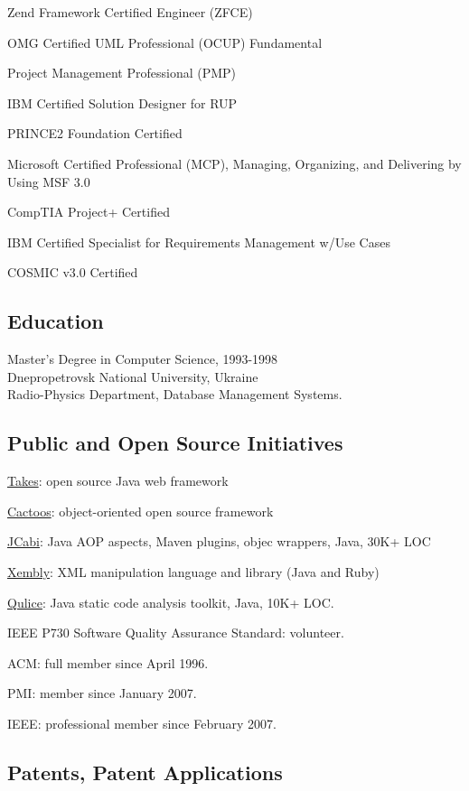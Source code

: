 \documentclass[12pt]{article}
\begin{document}
Zend Framework Certified Engineer (ZFCE)

OMG Certified UML Professional (OCUP) Fundamental

Project Management Professional (PMP)

IBM Certified Solution Designer for RUP

PRINCE2 Foundation Certified

Microsoft Certified Professional (MCP), Managing, Organizing, and Delivering by Using MSF 3.0

CompTIA Project+ Certified

IBM Certified Specialist for Requirements Management w/Use Cases

COSMIC v3.0 Certified

\subsection*{Education}

Master's Degree in Computer Science, 1993-1998\\
Dnepropetrovsk National University, Ukraine\\
Radio-Physics Department, Database Management Systems.

\subsection*{Public and Open Source Initiatives}

\href{http://www.takes.org}{Takes}: open source Java web framework

\href{http://www.cactoos.org}{Cactoos}: object-oriented open source framework

\href{http://www.jcabi.com}{JCabi}: Java AOP aspects, Maven plugins, objec wrappers, Java, 30K+ LOC

\href{http://www.xembly.org}{Xembly}: XML manipulation language and library (Java and Ruby)

\href{http://www.qulice.com}{Qulice}: Java static code analysis toolkit, Java, 10K+ LOC.

IEEE P730 Software Quality Assurance Standard: volunteer.

ACM: full member since April 1996.

PMI: member since January 2007.

IEEE: professional member since February 2007.

\subsection*{Patents, Patent Applications}
\end{document}
